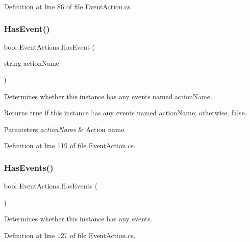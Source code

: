 Definition at line 86 of file Event\+Action.\+cs.

\mbox{\label{class_event_actions_a042920ebed150392f68e1d110b9c8d1d}} 
\subsubsection{\texorpdfstring{Has\+Event()}{HasEvent()}}
{\footnotesize\ttfamily bool Event\+Actions.\+Has\+Event (\begin{DoxyParamCaption}\item[{string}]{action\+Name }\end{DoxyParamCaption})}



Determines whether this instance has any events named action\+Name. 

\begin{DoxyReturn}{Returns}
{\ttfamily true} if this instance has any events named action\+Name; otherwise, {\ttfamily false}.
\end{DoxyReturn}

\begin{DoxyParams}{Parameters}
{\em action\+Name} & Action name.\\
\hline
\end{DoxyParams}


Definition at line 119 of file Event\+Action.\+cs.

\mbox{\label{class_event_actions_a356450553da17ec832729bbe14757c8c}} 
\subsubsection{\texorpdfstring{Has\+Events()}{HasEvents()}}
{\footnotesize\ttfamily bool Event\+Actions.\+Has\+Events (\begin{DoxyParamCaption}{ }\end{DoxyParamCaption})}



Determines whether this instance has any events. 



Definition at line 127 of file Event\+Action.\+cs.

